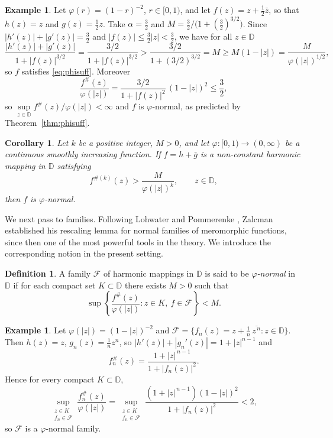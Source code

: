 \documentclass[11pt,reqno]{amsart}
\newtheorem{corollary}[theorem]{Corollary}
\theoremstyle{definition}
\newtheorem{definition}[theorem]{Definition}
\newtheorem{example}[theorem]{Example}
\newcommand{\D}{\mathbb{D}}
\begin{document}
\begin{example}\label{ex:phisuff}
Let $\varphi(r)=(1-r)^{-2}$, $r\in[0,1)$, and let $f(z)=z+\tfrac12\bar z$, so that
$h(z)=z$ and $g(z)=\tfrac12 z$. Take $\alpha=\tfrac32$ and
$M=\tfrac32\big/\big(1+(\tfrac32)^{3/2}\big)$. Since $|h'(z)|+|g'(z)|=\tfrac32$ and
$|f(z)|\le\tfrac32|z|<\tfrac32$, we have for all $z\in\D$
\[
\frac{|h'(z)|+|g'(z)|}{1+|f(z)|^{3/2}}
=\frac{3/2}{1+|f(z)|^{3/2}}
>\frac{3/2}{1+(3/2)^{3/2}}
=M\ge M(1-|z|)=\frac{M}{\varphi(|z|)^{1/2}},
\]
so $f$ satisfies \eqref{eq:phisuff}. Moreover
\[
\frac{f^{\#}(z)}{\varphi(|z|)}=\frac{3/2}{1+|f(z)|^{2}}\,(1-|z|)^{2}\le\frac32,
\]
so $\sup\limits_{z\in\D}f^{\#}(z)/\varphi(|z|)<\infty$ and $f$ is $\varphi$-normal, as predicted by
Theorem~\ref{thm:phisuff}.
\end{example}

\begin{corollary}\label{cor:phisuff}
Let $k$ be a positive integer, $M>0$, and let $\varphi\colon[0,1)\to(0,\infty)$ be a
continuous smoothly increasing function. If $f=h+\bar g$ is a non-constant harmonic mapping
in $\D$ satisfying
\begin{equation}\label{eq:corphisuff}
f^{\#(k)}(z)>\frac{M}{\varphi(|z|)^{k}},\qquad z\in\D,
\end{equation}
then $f$ is $\varphi$-normal.
\end{corollary}

We next pass to families. Following Lohwater and Pommerenke
\cite[Theorem~1]{LohwaterPommerenke}, Zalcman \cite{Zalcman} established his rescaling lemma
for normal families of meromorphic functions, since then one of the most powerful tools in
the theory. We introduce the corresponding notion in the present setting.

\begin{definition}\label{def:phifamily}
A family $\mathcal F$ of harmonic mappings in $\D$ is said to be \emph{$\varphi$-normal} in
$\D$ if for each compact set $K\subset\D$ there exists $M>0$ such that
\[
\sup\left\{\frac{f^{\#}(z)}{\varphi(|z|)}:z\in K,\ f\in\mathcal F\right\}<M.
\]
\end{definition}

\begin{example}\label{ex:phifamily}
Let $\varphi(|z|)=(1-|z|)^{-2}$ and
$\mathcal F=\big\{f_{n}(z)=z+\tfrac1n\,\overline{z^{\,n}}:z\in\D\big\}$. Then
$h(z)=z$, $g_{n}(z)=\tfrac1n z^{n}$, so $|h'(z)|+|g_{n}'(z)|=1+|z|^{n-1}$ and
\[
f_{n}^{\#}(z)=\frac{1+|z|^{\,n-1}}{1+|f_{n}(z)|^{2}}.
\]
Hence for every compact $K\subset\D$,
\[
\sup_{\substack{z\in K\\ f_{n}\in\mathcal F}}\frac{f_{n}^{\#}(z)}{\varphi(|z|)}
=\sup_{\substack{z\in K\\ f_{n}\in\mathcal F}}
\frac{(1+|z|^{\,n-1})(1-|z|)^{2}}{1+|f_{n}(z)|^{2}}<2,
\]
so $\mathcal F$ is a $\varphi$-normal family.
\end{example}
\end{document}
